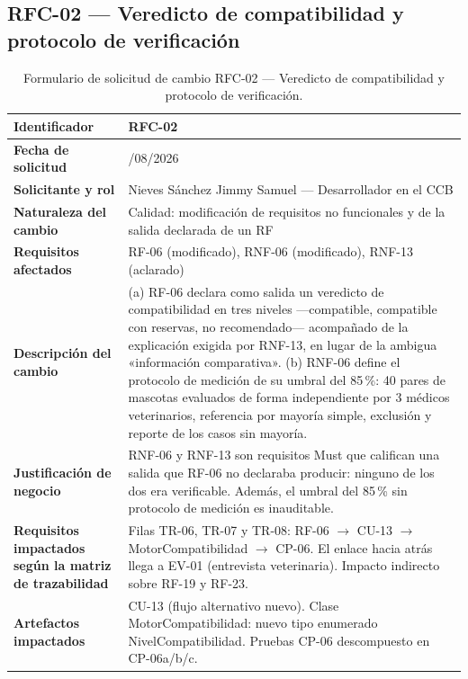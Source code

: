 \documentclass[journal,onecolumn]{IEEEtran}
\begin{document}
	\subsection{RFC-02 — Veredicto de compatibilidad y protocolo de verificación}
	
	\label{tab:rfc-02}
	\begin{longtable}{
			|>{\raggedright\arraybackslash}p{3.8cm}
			|>{\raggedright\arraybackslash}p{9.7cm}|
		}
		\caption{Formulario de solicitud de cambio RFC-02 — Veredicto de
			compatibilidad y protocolo de verificación.} \\
		\hline
		\textbf{Identificador} & RFC-02 \\
		\hline
		\textbf{Fecha de solicitud} & 09/08/2026 \\
		\hline
		\textbf{Solicitante y rol} & Nieves Sánchez Jimmy Samuel —
		Desarrollador en el CCB \\
		\hline
		\textbf{Naturaleza del cambio} & Calidad: modificación de
		requisitos no funcionales y de la salida declarada de un RF \\
		\hline
		\textbf{Requisitos afectados} & RF-06 (modificado), RNF-06
		(modificado), RNF-13 (aclarado) \\
		\hline
		\textbf{Descripción del cambio} & (a) RF-06 declara como salida un
		veredicto de compatibilidad en tres niveles —compatible,
		compatible con reservas, no recomendado— acompañado de la
		explicación exigida por RNF-13, en lugar de la ambigua
		«información comparativa». (b) RNF-06 define el protocolo de
		medición de su umbral del 85\,\%: 40 pares de mascotas evaluados
		de forma independiente por 3 médicos veterinarios, referencia por
		mayoría simple, exclusión y reporte de los casos sin mayoría. \\
		\hline
		\textbf{Justificación de negocio} & RNF-06 y RNF-13 son requisitos
		Must que califican una salida que RF-06 no declaraba producir:
		ninguno de los dos era verificable. Además, el umbral del 85\,\%
		sin protocolo de medición es inauditable. \\
		\hline
		\textbf{Requisitos impactados según la matriz de trazabilidad} &
		Filas TR-06, TR-07 y TR-08: RF-06 $\rightarrow$ CU-13
		$\rightarrow$ MotorCompatibilidad $\rightarrow$ CP-06. El enlace
		hacia atrás llega a EV-01 (entrevista veterinaria). Impacto
		indirecto sobre RF-19 y RF-23. \\
		\hline
		\textbf{Artefactos impactados} & CU-13 (flujo alternativo nuevo).
		Clase MotorCompatibilidad: nuevo tipo enumerado
		NivelCompatibilidad. Pruebas CP-06 descompuesto en CP-06a/b/c. \\

\end{longtable}
\end{document}
